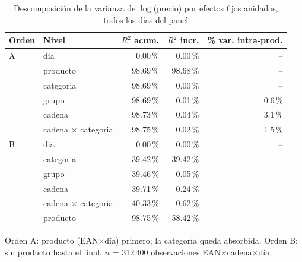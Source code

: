 \begin{table}[htbp]
\caption{Descomposici\'on de la varianza de $\log$(precio) por efectos fijos anidados, todos los d\'ias del panel}
\label{tab:varianza}
\centering\scriptsize\setlength{\tabcolsep}{3pt}
\begin{tabular}{@{}llrrr@{}}
\toprule
Orden & Nivel & $R^2$ acum. & $R^2$ incr. & \% var. intra-prod. \\
\midrule
A & dia & 0.00\,\% & 0.00\,\% & -- \\
 & producto & 98.69\,\% & 98.68\,\% & -- \\
 & categoria & 98.69\,\% & 0.00\,\% & -- \\
 & grupo & 98.69\,\% & 0.01\,\% & 0.6\,\% \\
 & cadena & 98.73\,\% & 0.04\,\% & 3.1\,\% \\
 & cadena $\times$ categoria & 98.75\,\% & 0.02\,\% & 1.5\,\% \\
\midrule
B & dia & 0.00\,\% & 0.00\,\% & -- \\
 & categoria & 39.42\,\% & 39.42\,\% & -- \\
 & grupo & 39.46\,\% & 0.05\,\% & -- \\
 & cadena & 39.71\,\% & 0.24\,\% & -- \\
 & cadena $\times$ categoria & 40.33\,\% & 0.62\,\% & -- \\
 & producto & 98.75\,\% & 58.42\,\% & -- \\
\bottomrule\end{tabular}
\par\smallskip\raggedright\scriptsize Orden A: producto (EAN$\times$d\'ia) primero; la categor\'ia queda absorbida. Orden B: sin producto hasta el final. $n$ = 312\,400 observaciones EAN$\times$cadena$\times$d\'ia.
\end{table}
